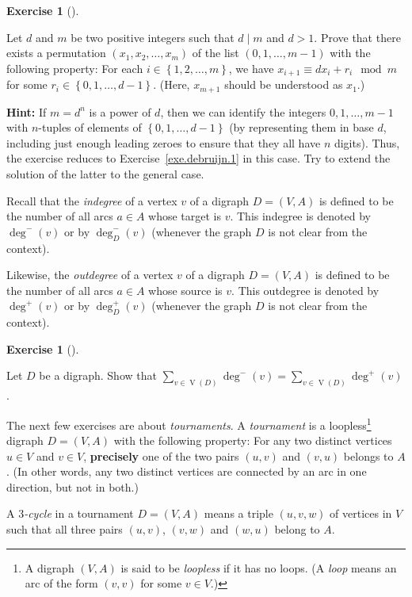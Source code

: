 \documentclass[numbers=enddot,12pt,final,onecolumn,notitlepage]{scrartcl}%
\newcounter{exer}
\theoremstyle{definition}
\newtheorem{exmp}[exer]{Exercise}
\newenvironment{exercise}[1][]
{\begin{exmp}[#1]\begin{leftbar}}
{\end{leftbar}\end{exmp}}
\let\sumnonlimits\sum
\renewcommand{\sum}{\sumnonlimits\limits}
\newenvironment{verlong}{}{}
\newcommand{\set}[1]{\left\{ #1 \right\}}
\newcommand{\tup}[1]{\left( #1 \right)}
\newcommand{\verts}[1]{\operatorname{V}\left( #1 \right)}
\begin{document}
\begin{verlong}
\begin{exercise}
Let $d$ and $m$ be two positive integers such that $d \mid m$ and
$d > 1$. Prove
that there exists a permutation
$\tup{x_1, x_2, \ldots, x_m}$ of the list $\tup{0, 1, \ldots, m-1}$
with the following property:
For each $i \in \set{1, 2, \ldots, m}$, we have
$x_{i+1} \equiv d x_i + r_i \mod m$ for some
$r_i \in \set{0, 1, \ldots, d-1}$. (Here, $x_{m+1}$ should be
understood as $x_1$.)

\textbf{Hint:} If $m = d^n$ is a power of $d$, then we can identify
the integers $0, 1, \ldots, m-1$ with $n$-tuples of elements of
$\set{0, 1, \ldots, d-1}$ (by representing them in base $d$, including
just enough leading zeroes to ensure that they all have $n$ digits).
Thus, the exercise reduces to Exercise~\ref{exe.debruijn.1} in this
case. Try to extend the solution of the latter to the general case.
\end{exercise}
\end{verlong}

Recall that the \textit{indegree} of a vertex $v$ of a digraph
$D = \tup{V, A}$ is defined to be the number of all arcs $a \in A$
whose target is $v$. This indegree is denoted by
$\deg^-\tup{v}$ or by $\deg^-_D\tup{v}$ (whenever the graph $D$ is not
clear from the context).

Likewise, the \textit{outdegree} of a vertex $v$ of a digraph
$D = \tup{V, A}$ is defined to be the number of all arcs $a \in A$
whose source is $v$. This outdegree is denoted by
$\deg^+\tup{v}$ or by $\deg^+_D\tup{v}$ (whenever the graph $D$ is not
clear from the context).

\begin{exercise}
Let $D$ be a digraph. Show that
$\sum_{v \in \verts{D}} \deg^-\tup{v}
= \sum_{v \in \verts{D}} \deg^+\tup{v}$.
\end{exercise}

The next few exercises are about \textit{tournaments}. A
\textit{tournament} is a loopless\footnote{A digraph $\tup{V, A}$ is
said to be \textit{loopless} if it has no loops. (A \textit{loop}
means an arc of the form $\tup{v, v}$ for some $v \in V$.)} digraph
$D = \tup{V, A}$ with the following
property: For any two distinct vertices $u \in V$ and $v \in V$,
\textbf{precisely} one of the two pairs $\tup{u, v}$ and $\tup{v, u}$
belongs to $A$. (In other words, any two distinct vertices are
connected by an arc in one direction, but not in both.)

A \textit{$3$-cycle} in a tournament $D = \tup{V, A}$ means a
triple $\tup{u, v, w}$ of vertices in $V$ such that all three pairs
$\tup{u, v}$, $\tup{v, w}$ and $\tup{w, u}$ belong to $A$.
\end{document}
